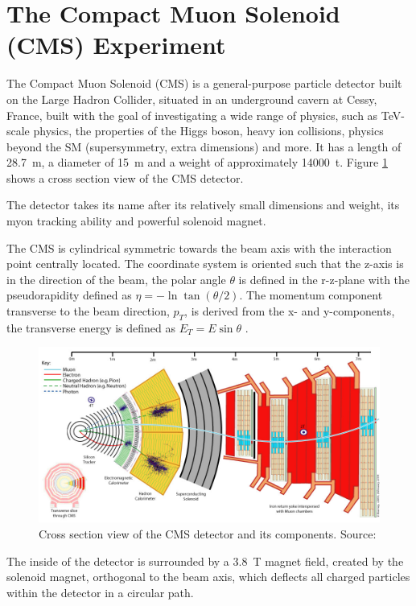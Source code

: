 \section{The Compact Muon Solenoid (CMS) Experiment}
The Compact Muon Solenoid (CMS) is a general-purpose particle detector built on the Large Hadron Collider, situated in an underground cavern at Cessy, France, built with the goal of investigating a wide range of physics, such as TeV-scale physics, the properties of the Higgs boson, heavy ion collisions, physics beyond the SM (supersymmetry, extra dimensions) and more. It has a length of \SI{28.7}{m}, a diameter of \SI{15}{m} and a weight of approximately \SI{14000}{t}. Figure \ref{fig:cms} shows a cross section view of the CMS detector.

The detector takes its name after its relatively small dimensions and weight, its myon tracking ability and powerful solenoid magnet.

The CMS is cylindrical symmetric towards the beam axis with the interaction point centrally located. The coordinate system is oriented such that the z-axis is in the direction of the beam, the polar angle $\theta$ is defined in the r-z-plane with the pseudorapidity defined as $\eta=-\ln{\tan{(\theta / 2)}}$. The momentum component transverse to the beam direction, $p_T$, is derived from the x- and y-components, the transverse energy is defined as $E_T=E \sin{\theta}$ \cite{Spannagel2017}.

\begin{figure}[H]
    \centering
    \includegraphics[width=15cm]{assets/chap02/cms.jpeg}
    \caption{Cross section view of the CMS detector and its components. Source: \cite{Davis:2205172}}
    \label{fig:cms}
\end{figure}

The inside of the detector is surrounded by a \SI{3.8}{T} magnet field, created by the solenoid magnet, orthogonal to the beam axis, which deflects all charged particles within the detector in a circular path.

